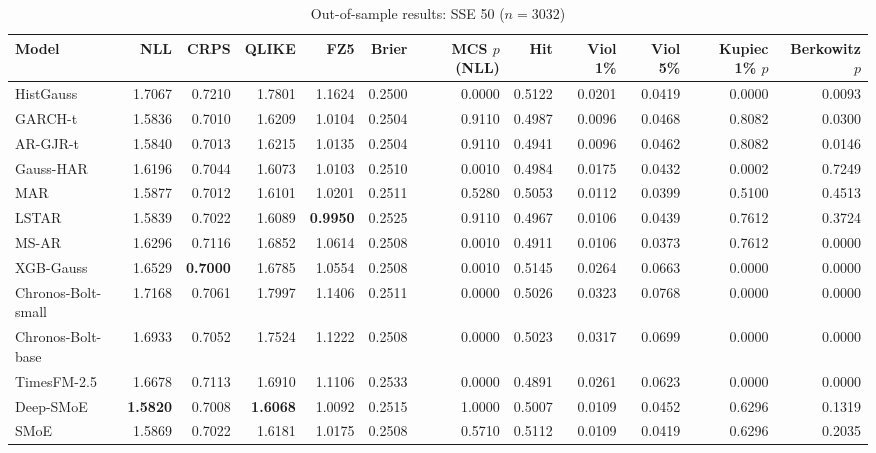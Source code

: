 \begin{table}[!htbp]\centering\scriptsize
\caption{Out-of-sample results: SSE 50 ($n=3032$)}\label{tab:asset_sse50}
\begin{adjustbox}{max width=\textwidth}
\begin{tabular}{lrrrrrrrrrrr}
\toprule
Model & NLL & CRPS & QLIKE & FZ5 & Brier & MCS $p$ (NLL) & Hit & Viol 1\% & Viol 5\% & Kupiec 1\% $p$ & Berkowitz $p$\\
\midrule
HistGauss & 1.7067 & 0.7210 & 1.7801 & 1.1624 & 0.2500 & 0.0000 & 0.5122 & 0.0201 & 0.0419 & 0.0000 & 0.0093\\
GARCH-t & 1.5836 & 0.7010 & 1.6209 & 1.0104 & 0.2504 & 0.9110 & 0.4987 & 0.0096 & 0.0468 & 0.8082 & 0.0300\\
AR-GJR-t & 1.5840 & 0.7013 & 1.6215 & 1.0135 & 0.2504 & 0.9110 & 0.4941 & 0.0096 & 0.0462 & 0.8082 & 0.0146\\
Gauss-HAR & 1.6196 & 0.7044 & 1.6073 & 1.0103 & 0.2510 & 0.0010 & 0.4984 & 0.0175 & 0.0432 & 0.0002 & 0.7249\\
MAR & 1.5877 & 0.7012 & 1.6101 & 1.0201 & 0.2511 & 0.5280 & 0.5053 & 0.0112 & 0.0399 & 0.5100 & 0.4513\\
LSTAR & 1.5839 & 0.7022 & 1.6089 & \textbf{0.9950} & 0.2525 & 0.9110 & 0.4967 & 0.0106 & 0.0439 & 0.7612 & 0.3724\\
MS-AR & 1.6296 & 0.7116 & 1.6852 & 1.0614 & 0.2508 & 0.0010 & 0.4911 & 0.0106 & 0.0373 & 0.7612 & 0.0000\\
XGB-Gauss & 1.6529 & \textbf{0.7000} & 1.6785 & 1.0554 & 0.2508 & 0.0010 & 0.5145 & 0.0264 & 0.0663 & 0.0000 & 0.0000\\
Chronos-Bolt-small & 1.7168 & 0.7061 & 1.7997 & 1.1406 & 0.2511 & 0.0000 & 0.5026 & 0.0323 & 0.0768 & 0.0000 & 0.0000\\
Chronos-Bolt-base & 1.6933 & 0.7052 & 1.7524 & 1.1222 & 0.2508 & 0.0000 & 0.5023 & 0.0317 & 0.0699 & 0.0000 & 0.0000\\
TimesFM-2.5 & 1.6678 & 0.7113 & 1.6910 & 1.1106 & 0.2533 & 0.0000 & 0.4891 & 0.0261 & 0.0623 & 0.0000 & 0.0000\\
Deep-SMoE & \textbf{1.5820} & 0.7008 & \textbf{1.6068} & 1.0092 & 0.2515 & 1.0000 & 0.5007 & 0.0109 & 0.0452 & 0.6296 & 0.1319\\
SMoE & 1.5869 & 0.7022 & 1.6181 & 1.0175 & 0.2508 & 0.5710 & 0.5112 & 0.0109 & 0.0419 & 0.6296 & 0.2035\\
\bottomrule
\end{tabular}
\end{adjustbox}
\end{table}